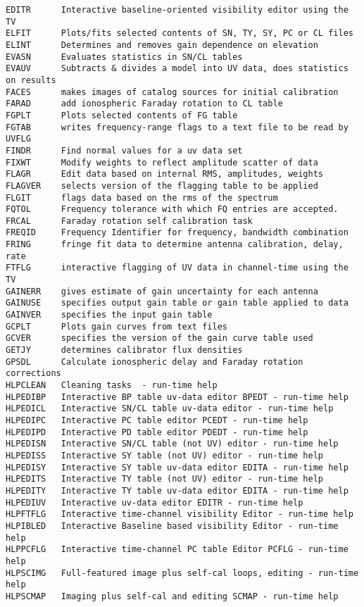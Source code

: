 \begin{verbatim}
EDITR      Interactive baseline-oriented visibility editor using the TV
ELFIT      Plots/fits selected contents of SN, TY, SY, PC or CL files
ELINT      Determines and removes gain dependence on elevation
EVASN      Evaluates statistics in SN/CL tables
EVAUV      Subtracts & divides a model into UV data, does statistics on results
FACES      makes images of catalog sources for initial calibration
FARAD      add ionospheric Faraday rotation to CL table
FGPLT      Plots selected contents of FG table
FGTAB      writes frequency-range flags to a text file to be read by UVFLG
FINDR      Find normal values for a uv data set
FIXWT      Modify weights to reflect amplitude scatter of data
FLAGR      Edit data based on internal RMS, amplitudes, weights
FLAGVER    selects version of the flagging table to be applied
FLGIT      flags data based on the rms of the spectrum
FQTOL      Frequency tolerance with which FQ entries are accepted.
FRCAL      Faraday rotation self calibration task
FREQID     Frequency Identifier for frequency, bandwidth combination
FRING      fringe fit data to determine antenna calibration, delay, rate
FTFLG      interactive flagging of UV data in channel-time using the TV
GAINERR    gives estimate of gain uncertainty for each antenna
GAINUSE    specifies output gain table or gain table applied to data
GAINVER    specifies the input gain table
GCPLT      Plots gain curves from text files
GCVER      specifies the version of the gain curve table used
GETJY      determines calibrator flux densities
GPSDL      Calculate ionospheric delay and Faraday rotation corrections
HLPCLEAN   Cleaning tasks  - run-time help
HLPEDIBP   Interactive BP table uv-data editor BPEDT - run-time help
HLPEDICL   Interactive SN/CL table uv-data editor - run-time help
HLPEDIPC   Interactive PC table editor PCEDT - run-time help
HLPEDIPD   Interactive PD table editor PDEDT - run-time help
HLPEDISN   Interactive SN/CL table (not UV) editor - run-time help
HLPEDISS   Interactive SY table (not UV) editor - run-time help
HLPEDISY   Interactive SY table uv-data editor EDITA - run-time help
HLPEDITS   Interactive TY table (not UV) editor - run-time help
HLPEDITY   Interactive TY table uv-data editor EDITA - run-time help
HLPEDIUV   Interactive uv-data editor EDITR - run-time help
HLPFTFLG   Interactive time-channel visibility Editor - run-time help
HLPIBLED   Interactive Baseline based visibility Editor - run-time help
HLPPCFLG   Interactive time-channel PC table Editor PCFLG - run-time help
HLPSCIMG   Full-featured image plus self-cal loops, editing - run-time help
HLPSCMAP   Imaging plus self-cal and editing SCMAP - run-time help

\end{verbatim}
